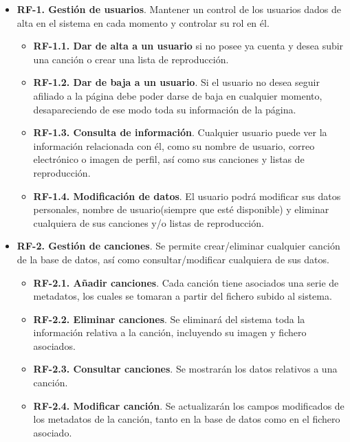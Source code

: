 \begin{itemize}
	\item \textbf{RF-1. Gestión de usuarios}. Mantener un control de los usuarios dados de alta en el sistema en cada momento y controlar su rol en él.
	\begin{itemize}
		\item \textbf{RF-1.1. Dar de alta a un usuario} si no posee ya cuenta y desea subir una canción o crear una lista de reproducción.
		\item \textbf{RF-1.2. Dar de baja a un usuario}. Si el usuario no desea seguir afiliado a la página debe poder darse de baja en cualquier momento, desapareciendo de ese modo toda su información de la página.
		\item \textbf{RF-1.3. Consulta de información}. Cualquier usuario puede ver la información relacionada con él, como su nombre de usuario, correo electrónico o imagen de perfil, así como sus canciones y listas de reproducción.
		\item \textbf{RF-1.4. Modificación de datos}. El usuario podrá modificar sus datos personales, nombre de usuario(siempre que esté disponible) y eliminar cualquiera de sus canciones y/o listas de reproducción.
	\end{itemize}				
	
	\item \textbf{RF-2. Gestión de canciones}. Se permite crear/eliminar cualquier canción de la base de datos, así como consultar/modificar cualquiera de sus datos.
	\begin{itemize}
		\item \textbf{RF-2.1. Añadir canciones}. Cada canción tiene asociados una serie de metadatos, los cuales se tomaran a partir del fichero subido al sistema.
		\item \textbf{RF-2.2. Eliminar canciones}. Se eliminará del sistema toda la información relativa a la canción, incluyendo su imagen y fichero asociados.
		\item \textbf{RF-2.3. Consultar canciones}. Se mostrarán los datos relativos a una canción.
		\item \textbf{RF-2.4. Modificar canción}. Se actualizarán los campos modificados de los metadatos de la canción, tanto en la base de datos como en el fichero asociado.
	\end{itemize}
	

\end{itemize}
